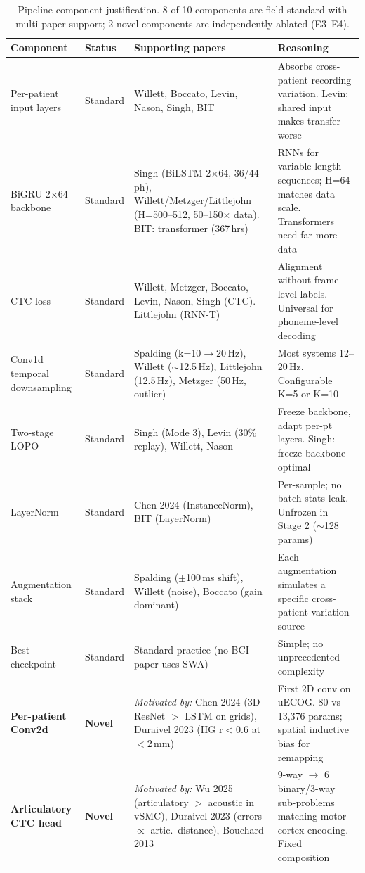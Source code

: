 \documentclass[11pt, letterpaper]{article}
\begin{document}
\begin{table}[h!]
\centering
\footnotesize
\setlength{\tabcolsep}{4pt}
\begin{tabular}{@{}L{2.4cm}lL{4.2cm}L{4.8cm}@{}}
\toprule
\textbf{Component} & \textbf{Status} & \textbf{Supporting papers} & \textbf{Reasoning} \\
\midrule
Per-patient input layers & Standard & Willett, Boccato, Levin, Nason, Singh, BIT & Absorbs cross-patient recording variation. Levin: shared input makes transfer worse \\[4pt]
BiGRU 2$\times$64 backbone & Standard & Singh (BiLSTM 2$\times$64, 36/44 ph), Willett/Metzger/Littlejohn (H=500--512, 50--150$\times$ data). BIT: transformer (367\,hrs) & RNNs for variable-length sequences; H=64 matches data scale. Transformers need far more data \\[4pt]
CTC loss & Standard & Willett, Metzger, Boccato, Levin, Nason, Singh (CTC). Littlejohn (RNN-T) & Alignment without frame-level labels. Universal for phoneme-level decoding \\[4pt]
Conv1d temporal downsampling & Standard & Spalding (k=10$\to$20\,Hz), Willett ($\sim$12.5\,Hz), Littlejohn (12.5\,Hz), Metzger (50\,Hz, outlier) & Most systems 12--20\,Hz. Configurable K=5 or K=10 \\[4pt]
Two-stage LOPO & Standard & Singh (Mode 3), Levin (30\% replay), Willett, Nason & Freeze backbone, adapt per-pt layers. Singh: freeze-backbone optimal \\[4pt]
LayerNorm & Standard & Chen 2024 (InstanceNorm), BIT (LayerNorm) & Per-sample; no batch stats leak. Unfrozen in Stage 2 ($\sim$128 params) \\[4pt]
Augmentation stack & Standard & Spalding ($\pm$100\,ms shift), Willett (noise), Boccato (gain dominant) & Each augmentation simulates a specific cross-patient variation source \\[4pt]
Best-checkpoint & Standard & Standard practice (no BCI paper uses SWA) & Simple; no unprecedented complexity \\
\midrule
\textbf{Per-patient Conv2d} & \textbf{Novel} & \textit{Motivated by:} Chen 2024 (3D ResNet $>$ LSTM on grids), Duraivel 2023 (HG r$<$0.6 at $<$2\,mm) & First 2D conv on uECOG. 80 vs 13{,}376 params; spatial inductive bias for remapping \\[4pt]
\textbf{Articulatory CTC head} & \textbf{Novel} & \textit{Motivated by:} Wu 2025 (articulatory $>$ acoustic in vSMC), Duraivel 2023 (errors $\propto$ artic.\ distance), Bouchard 2013 & 9-way $\to$ 6 binary/3-way sub-problems matching motor cortex encoding. Fixed composition \\
\bottomrule
\end{tabular}
\caption{Pipeline component justification. 8 of 10 components are field-standard with multi-paper support; 2 novel components are independently ablated (E3--E4).}
\label{tab:components}
\end{table}
\end{document}
